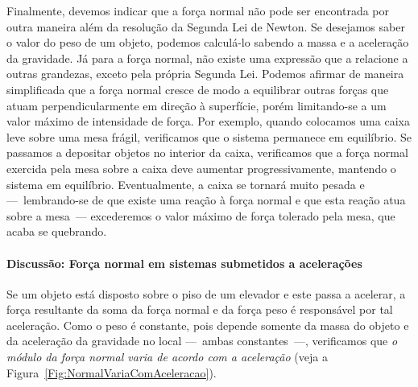 Finalmente, devemos indicar que a força normal não pode ser encontrada por outra maneira além da resolução da Segunda Lei de Newton. Se desejamos saber o valor do peso de um objeto, podemos calculá-lo sabendo a massa e a aceleração da gravidade. Já para a força normal, não existe uma expressão que a relacione a outras grandezas, exceto pela própria Segunda Lei. Podemos afirmar de maneira simplificada que a força normal cresce de modo a equilibrar outras forças que atuam perpendicularmente em direção à superfície, porém limitando-se a um valor máximo de intensidade de força. Por exemplo, quando colocamos uma caixa leve sobre uma mesa frágil, verificamos que o sistema permanece em equilíbrio. Se passamos a depositar objetos no interior da caixa, verificamos que a força normal exercida pela mesa sobre a caixa deve aumentar progressivamente, mantendo o sistema em equilíbrio. Eventualmente, a caixa se tornará muito pesada e ---~lembrando-se de que existe uma reação à força normal e que esta reação atua sobre a mesa~--- excederemos o valor máximo de força tolerado pela mesa, que acaba se quebrando.

\paragraph{Discussão: Força normal em sistemas submetidos a acelerações}

Se um objeto está disposto sobre o piso de um elevador e este passa a acelerar, a força resultante da soma da força normal e da força peso é responsável por tal aceleração. Como o peso é constante, pois depende somente da massa do objeto e da aceleração da gravidade no local ---~ambas constantes~---, verificamos que \emph{o módulo da força normal varia de acordo com a aceleração} (veja a Figura~\ref{Fig:NormalVariaComAceleracao}).

